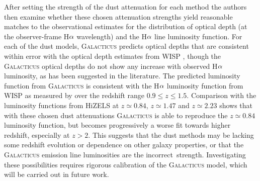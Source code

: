 After setting the strength of the dust attenuation for each method the
authors then examine whether these chosen attenuation strengths yield
reasonable matches to the observational estimates for the distribution
of optical depth (at the observer-frame H${\rm \alpha}$ wavelength)
and the H${\rm \alpha}$ line luminosity function. For each of the dust
models, \textsc{Galacticus} predicts optical depths that are
consistent within error with the optical depth estimates from WISP
\citep{Dominguez13}, though the \textsc{Galacticus} optical depths do
not show any increase with observed H${\rm \alpha}$ luminosity, as has
been suggested in the literature. The predicted luminosity function
from \textsc{Galacticus} is consistent with the H${\rm \alpha}$
luminosity function from WISP as measured by \citet{Colbert13} over the redshift range $0.9\leqslant z \leqslant 1.5$. Comparison with the luminosity functions from HiZELS \citep{Sobral13} at $z\simeq 0.84$, $z\simeq 1.47$ and $z\simeq 2.23$
shows that with these chosen dust attenuations \textsc{Galacticus} is
able to reproduce the $z\simeq 0.84$ luminosity function, but becomes
progressively a worse fit towards higher redshift, especially at
$z>2$. This suggests that the dust methods may be lacking some
redshift evolution or dependence on other galaxy properties, or that
the \textsc{Galacticus} emission line luminosities are the
incorrect\ strength. Investigating these possibilities requires
rigorous calibration of the \textsc{Galacticus} model, which will be
carried out in future work.

